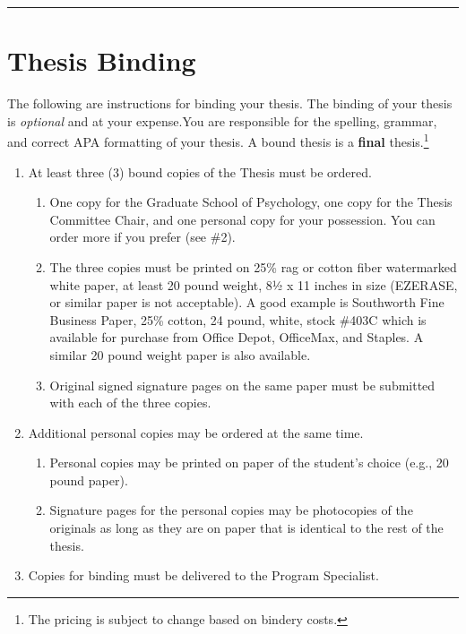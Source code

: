 \documentclass[openany]{book}
\providecommand{\tightlist}{%
  \setlength{\itemsep}{0pt}\setlength{\parskip}{0pt}}
\begin{document}
\begin{center}\rule{0.5\linewidth}{0.5pt}\end{center}

\hypertarget{binding}{%
\chapter{Thesis Binding}\label{binding}}

The following are instructions for binding your thesis. The binding of your thesis is \emph{optional} and at your expense.You are responsible for the spelling, grammar, and correct APA formatting of your thesis. A bound thesis is a \textbf{final} thesis.\footnote{The pricing is subject to change based on bindery costs.}

\begin{enumerate}
\def\labelenumi{\arabic{enumi}.}
\tightlist
\item
  At least three (3) bound copies of the Thesis must be ordered.

  \begin{enumerate}
  \def\labelenumii{\alph{enumii}.}
  \tightlist
  \item
    One copy for the Graduate School of Psychology, one copy for the Thesis Committee Chair, and one personal copy for your possession. You can order more if you prefer (see \#2).
  \item
    The three copies must be printed on 25\% rag or cotton fiber watermarked white paper, at least 20 pound weight, 8½ x 11 inches in size (EZERASE, or similar paper is not acceptable). A good example is Southworth Fine Business Paper, 25\% cotton, 24 pound, white, stock \#403C which is available for purchase from Office Depot, OfficeMax, and Staples. A similar 20 pound weight paper is also available.
  \item
    Original signed signature pages on the same paper must be submitted with each of the three copies.
  \end{enumerate}
\item
  Additional personal copies may be ordered at the same time.

  \begin{enumerate}
  \def\labelenumii{\alph{enumii}.}
  \tightlist
  \item
    Personal copies may be printed on paper of the student's choice (e.g., 20 pound paper).
  \item
    Signature pages for the personal copies may be photocopies of the originals as long as they are on paper that is identical to the rest of the thesis.
  \end{enumerate}
\item
  Copies for binding must be delivered to the Program Specialist.


\end{enumerate}
\end{document}
